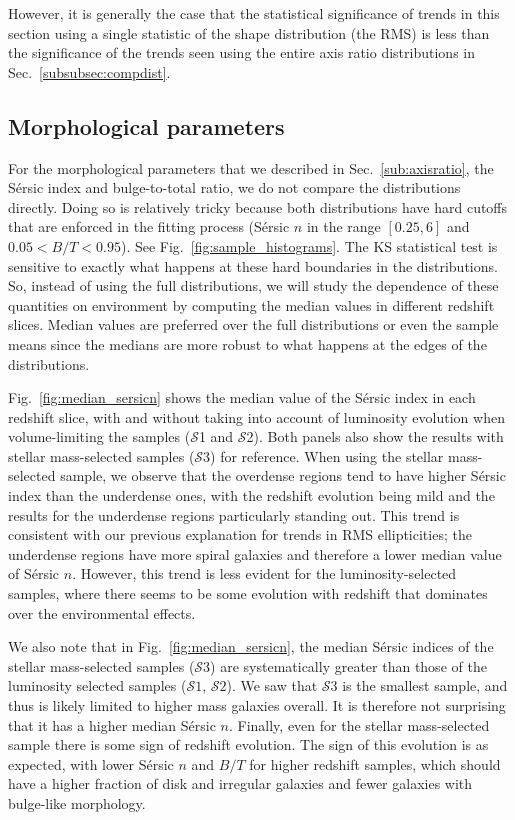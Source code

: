 \documentclass[twocolumn,useAMS,usenatbib]{mn2e}
\newcommand{\arun}[1]{{\textcolor{blue}{#1}}}
\newcommand{\sersic}{S\'{e}rsic }
\newcommand{\s}{\ensuremath{\mathcal{S}}}
\begin{document}
However, it is generally the case that the statistical significance of
trends in this section using a single statistic of the shape
distribution (the RMS) is less than the significance of the trends
seen using the entire axis ratio distributions in Sec.~\ref{subsubsec:compdist}.

\subsection{Morphological parameters}

For the morphological parameters that we described in
Sec.~\ref{sub:axisratio}, the \sersic index and bulge-to-total ratio,
we do not compare the distributions directly.  Doing so is relatively
tricky because both distributions have hard cutoffs that are enforced
in the fitting process (\sersic $n$ in the range $[0.25, 6]$ and
$0.05<B/T<0.95$). See Fig.~\ref{fig:sample_histograms}.
The KS statistical test is sensitive to exactly what happens at these hard boundaries in the distributions.
So, instead of using the full distributions, we will study the
dependence of these quantities on environment by computing the median
values in different redshift slices.  Median values are preferred
over the full distributions or even the sample means since the medians
are more robust to what happens at the edges of the distributions.

Fig.~\ref{fig:median_sersicn} shows the median value of the \sersic
index in each redshift slice, with and without taking into account of
luminosity evolution when volume-limiting the samples (\s1 and
\s2). Both panels also show the results with stellar mass-selected
samples (\s3) for reference.  
When using the stellar mass-selected sample, we observe that the
overdense regions tend to have higher \sersic 
index than the underdense ones, with the redshift evolution being mild
and the results for the underdense regions particularly standing
out. This trend is consistent with our previous explanation for trends
in RMS ellipticities; the underdense regions have more spiral galaxies
and therefore a lower median value of \sersic $n$. 
However, this trend is less evident for the luminosity-selected
samples, where there seems to be some evolution with redshift that
dominates over the environmental effects.

We also note that in Fig.~\ref{fig:median_sersicn}, the median \sersic
indices of the stellar mass-selected samples (\s$3$) are
systematically greater than those of the luminosity selected samples
(\s$1$, \s$2$).  We saw that \s3 is the smallest sample, and thus is
likely limited to higher mass galaxies overall.  It is therefore not
surprising that it has a higher median \sersic $n$.  Finally, even for
the stellar mass-selected sample there is some sign of redshift
evolution.  The sign of this evolution is as expected, with lower
\sersic $n$ and $B/T$ for higher redshift samples, which should have a
higher fraction of disk and irregular galaxies and fewer galaxies with
bulge-like morphology.
 
\end{document}
